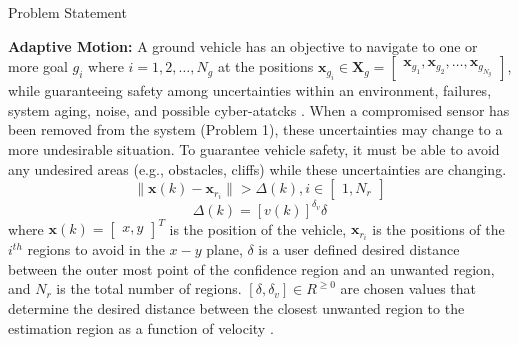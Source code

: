 \begin{section}{Problem Statement}
\begin{problem} \label{problem2} {\textbf{Adaptive Motion:}} 
A ground vehicle has an objective to navigate to one or more goal $g_i$ where $i=1,2,\dots,N_g$ at the positions $\bm{x}_{g_i} \in \bm{X}_g =  \begin{bmatrix} \bm{x}_{g_1},\bm{x}_{g_2},\dots,\bm{x}_{g_{N_g}} \end{bmatrix}$, while guaranteeing safety among uncertainties within an environment, failures, system aging, noise, and possible cyber-atatcks . When a compromised sensor has been removed from the system (Problem 1), these uncertainties may change to a more undesirable situation. To guarantee vehicle safety, it must be able to avoid any undesired areas (e.g., obstacles, cliffs) while these uncertainties are changing.
	\begin{equation}
		\lVert {\bm{x}(k)-\bm{x}_{r_i}} \rVert >\Delta(k),  i \in \begin{bmatrix} 1,N_r \end{bmatrix}
	\end{equation}
	\begin{equation}
		\Delta(k)=[v(k)]^{\delta_v}\delta
	\end{equation}
where $\bm{x}(k)={\begin{bmatrix} x,y \end{bmatrix}}^T$ is the position of the vehicle, $\bm{x}_{r_i}$ is the positions of the ${i}^{th}$ regions to avoid in the $x-y$ plane, $\delta$ is a user defined desired distance between the outer most point of the confidence region and an unwanted region, and $N_r$ is the total number of regions. $[\delta, \delta_v] \in R^{\geq0}$ are chosen values that determine the desired distance between the closest unwanted region to the estimation region as a function of velocity .





\end{problem}
\end{section}
